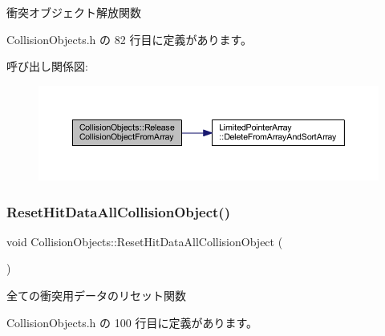 衝突オブジェクト解放関数 



 Collision\+Objects.\+h の 82 行目に定義があります。

呼び出し関係図\+:\nopagebreak
\begin{figure}[H]
\begin{center}
\leavevmode
\includegraphics[width=350pt]{class_collision_objects_a38bfe55a93549c90d416c0d1d560932b_cgraph}
\end{center}
\end{figure}
\mbox{\label{class_collision_objects_a01ffe9567540a819f19cd66f96981b47}} 
\subsubsection{\texorpdfstring{Reset\+Hit\+Data\+All\+Collision\+Object()}{ResetHitDataAllCollisionObject()}}
{\footnotesize\ttfamily void Collision\+Objects\+::\+Reset\+Hit\+Data\+All\+Collision\+Object (\begin{DoxyParamCaption}{ }\end{DoxyParamCaption})\hspace{0.3cm}{\ttfamily [inline]}}



全ての衝突用データのリセット関数 



 Collision\+Objects.\+h の 100 行目に定義があります。

